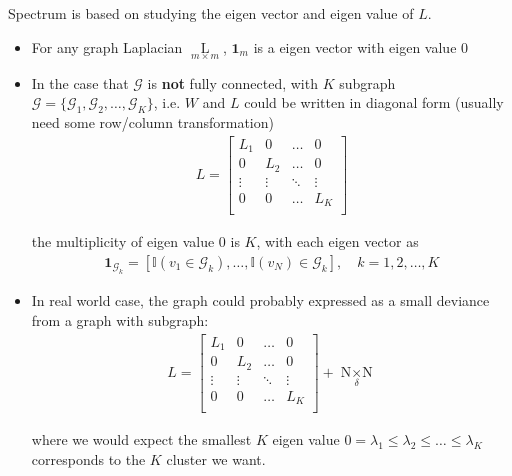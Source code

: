     Spectrum is based on studying the eigen vector and eigen value of $ L $.
\begin{itemize}[topsep=2pt,itemsep=0pt]
    \item For any graph Laplacian $ \mathop{L}\limits_{m\times m}  $, $ \mathbf{1}_m $ is a eigen vector with eigen value $ 0 $
    \item In the case that $ \mathcal{G} $ is \textbf{not} fully connected, with $ K $ subgraph $ \mathcal{G}=\{\mathcal{G}_1,\mathcal{G}_2,\ldots,\mathcal{G}_K\} $, i.e. $ W $ and $ L $ could be written in diagonal form (usually need some row/column transformation)
    \begin{align}
        L=\begin{bmatrix}
        L_{1}&0&\ldots&0\\
        0&L_{2}&\ldots&0\\
        \vdots&\vdots&\ddots&\vdots\\
        0&0&\ldots&L_{K}\\
        \end{bmatrix} 
    \end{align}

    the multiplicity of eigen value $ 0 $ is $ K $, with each eigen vector as
    \begin{align}
         \mathbf{1}_{\mathcal{G}_k}=[\mathbb{I}(v_1\in \mathcal{G}_k),\ldots,\mathbb{I}(v_N)\in\mathcal{G}_k],\quad k=1,2,\ldots,K
    \end{align}
    \item In real world case, the graph could probably expressed as a small deviance from a graph with subgraph:
    \begin{align}
         L=\begin{bmatrix}
            L_{1}&0&\ldots&0\\
            0&L_{2}&\ldots&0\\
            \vdots&\vdots&\ddots&\vdots\\
            0&0&\ldots&L_{K}\\
            \end{bmatrix} +\mathop{N\times N}\limits_{\delta } 
    \end{align}
    
    where we would expect the smallest $ K $ eigen value $ 0=\lambda _1\leq \lambda _2\leq\ldots \leq \lambda _K $ corresponds to the $ K $ cluster we want.

     
\end{itemize}

